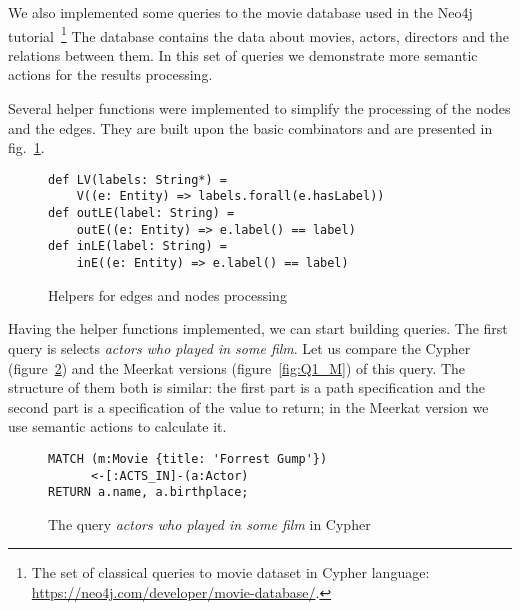 We also implemented some queries to the movie database used in the Neo4j tutorial~\footnote{The set of classical queries to movie dataset in Cypher language: \url{https://neo4j.com/developer/movie-database/}. }
The database contains the data about movies, actors, directors and the relations between them.
In this set of queries we demonstrate more semantic actions for the results processing. 


Several helper functions were implemented to simplify the processing of the nodes and the edges. 
They are built upon the basic combinators and are presented in fig.~\ref{fig:helpers}.


\begin{figure}[h]
\begin{lstlisting}
def LV(labels: String*) = 
    V((e: Entity) => labels.forall(e.hasLabel))
def outLE(label: String) = 
    outE((e: Entity) => e.label() == label)
def inLE(label: String) = 
    inE((e: Entity) => e.label() == label)
\end{lstlisting}
\caption{Helpers for edges and nodes processing}
\label{fig:helpers}
\end{figure}

Having the helper functions implemented, we can start building queries. 
The first query is selects \emph{actors who played in some film}.
Let us compare the Cypher (figure~\ref{fig:Q1_C}) and the Meerkat versions (figure~\ref{fig:Q1_M}) of this query.
The structure of them both is similar: the first part is a path specification and the second part is a specification of the value to return; in the Meerkat version we use semantic actions to calculate it.

\begin{figure}[h]
\begin{lstlisting}
MATCH (m:Movie {title: 'Forrest Gump'})
      <-[:ACTS_IN]-(a:Actor)
RETURN a.name, a.birthplace;
\end{lstlisting}
\caption{The query \emph{actors who played in some film} in Cypher}
\label{fig:Q1_C}
\end{figure}


